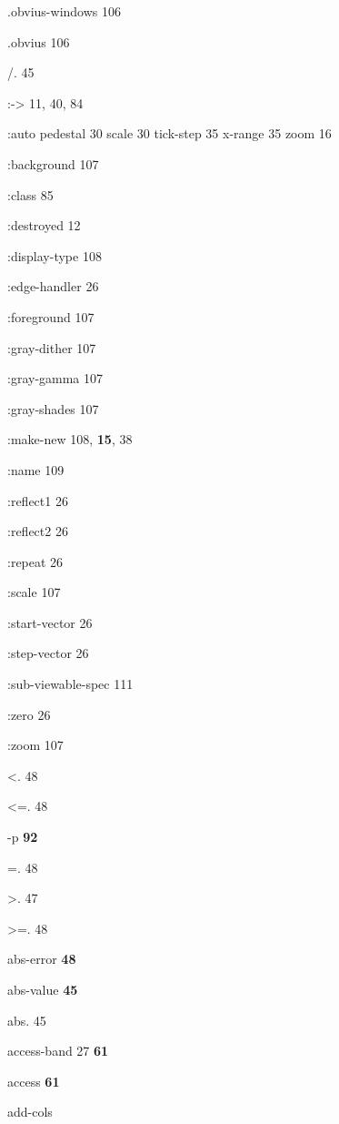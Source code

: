 \begin{theindex}
\item {\ptt .obvius-windows} 106
\item {\ptt .obvius} 106
\item {\ptt /.} 45
\item {\ptt :->} 11, 40, 84
\item {\ptt :auto}
\subitem pedestal 30
\subitem scale 30
\subitem tick-step 35
\subitem x-range 35
\subitem zoom 16
\item {\ptt :background} 107
\item {\ptt :class} 85
\item {\ptt :destroyed} 12
\item {\ptt :display-type} 108
\item {\ptt :edge-handler} 26
\item {\ptt :foreground} 107
\item {\ptt :gray-dither} 107
\item {\ptt :gray-gamma} 107
\item {\ptt :gray-shades} 107
\item {\ptt :make-new} 108, {\bf 15}, 38
\item {\ptt :name} 109
\item {\ptt :reflect1} 26
\item {\ptt :reflect2} 26
\item {\ptt :repeat} 26
\item {\ptt :scale} 107
\item {\ptt :start-vector} 26
\item {\ptt :step-vector} 26
\item {\ptt :sub-viewable-spec} 111
\item {\ptt :zero} 26
\item {\ptt :zoom} 107
\item {\ptt <.} 48
\item {\ptt <=.} 48
\item {-p} {\bf 92}
\item {\ptt =.} 48
\item {\ptt >.} 47
\item {\ptt >=.} 48
\item {\ptt abs-error} {\bf 48}
\item {\ptt abs-value}
 {\bf 45}
\item {\ptt abs.} 45
\item {\ptt access-band} 27
 {\bf 61}
\item {\ptt access}
 {\bf 61}
\item {\ptt add-cols}

\end{theindex}
